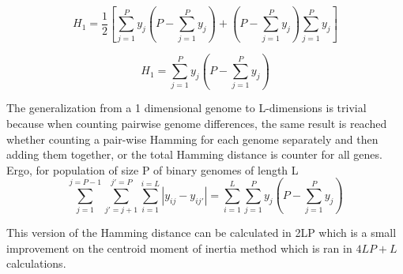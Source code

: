 \begin{equation*}
    H_{1} = \frac{1}{2}\left [\sum_{j=1}^{P}y_{j}\left (P - \sum_{j=1}^{P}y_{j} \right) + \left (P - \sum_{j=1}^{P}y_{j} \right)\sum_{j=1}^{P}y_{j}\right ]
\end{equation*}

\begin{equation}
    \label{eq:linearHamming}
    H_{1} = \sum_{j=1}^{P}y_{j}\left (P - \sum_{j=1}^{P}y_{j} \right)
\end{equation}

The generalization from a 1 dimensional genome to L-dimensions is trivial because when counting pairwise genome differences, the same result is reached whether counting a pair-wise Hamming for each genome separately and then adding them together, or the total Hamming distance is counter for all genes. Ergo, for population of size P of binary genomes of length L
\begin{equation}
    \label{eq:proved}
    \sum_{j=1}^{j=P-1}\sum_{{j}'=j+1}^{{j}'=P}\sum_{i=1}^{i=L}\left |y_{ij}-y_{i{j}'}\right | = \sum_{i=1}^{L}\sum_{j=1}^{P}y_{j}\left (P - \sum_{j=1}^{P}y_{j} \right)
\end{equation}

This version of the Hamming distance can be calculated in 2LP which is a small improvement on the centroid moment of inertia method which is ran in \(4LP + L\) calculations. 


